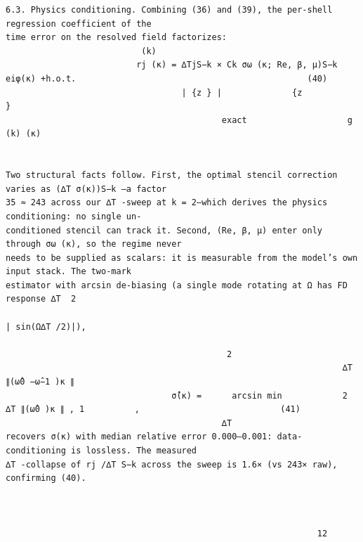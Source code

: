 \documentclass[letterpaper]{article}
\begin{document}
\begin{Verbatim}[fontsize=\fontsize{6.35}{7.15}\selectfont,breaklines=false]
6.3. Physics conditioning. Combining (36) and (39), the per-shell regression coefficient of the
time error on the resolved field factorizes:
                           (k)
                          rj (κ) = ∆TjS−k × Ck σω (κ; Re, β, μ)S−k eiφ(κ) +h.o.t.                                              (40)
                                   | {z } |              {z             }
                                           exact                    g (k) (κ)


Two structural facts follow. First, the optimal stencil correction varies as (∆T σ(κ))S−k —a factor
35 ≈ 243 across our ∆T -sweep at k = 2—which derives the physics conditioning: no single un-
conditioned stencil can track it. Second, (Re, β, μ) enter only through σω (κ), so the regime never
needs to be supplied as scalars: it is measurable from the model’s own input stack. The two-mark
estimator with arcsin de-biasing (a single mode rotating at Ω has FD response ∆T  2
                                                                                    | sin(Ω∆T /2)|),

                                            2                                               
                                                                   ∆T ∥(ω̂0 −ω̂−1 )κ ∥
                                 σ̂(κ) =      arcsin min            2  ∆T ∥(ω̂0 )κ ∥ , 1          ,                            (41)
                                           ∆T
recovers σ(κ) with median relative error 0.000–0.001: data-conditioning is lossless. The measured
∆T -collapse of rj /∆T S−k across the sweep is 1.6× (vs 243× raw), confirming (40).



                                                              12
\end{Verbatim}
\newpage
\end{document}
